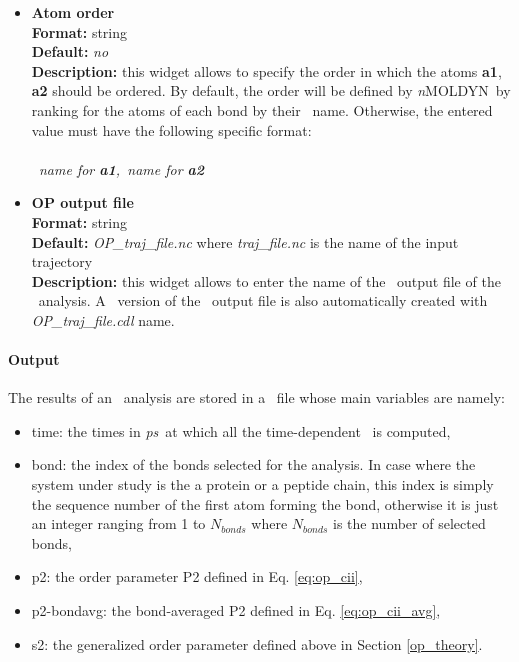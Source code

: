 \documentclass[a4paper,11pt]{report}
\newcommand{\ps}{\textit{ps}}
\newcommand{\NMOLDYN}{\textit{n}MOLDYN}
\begin{document}
\begin{itemize}
\hypertarget{op_atom_order}{}
\item \textbf{Atom order}\\
\textbf{Format:} string\\
\textbf{Default:} \textit{no}\\
\textbf{Description:} this widget allows to specify the order in which the atoms \textbf{a1}, \textbf{a2} should be 
ordered. By default, the order will be defined by \NMOLDYN\ by ranking for the atoms of each bond by their
\MMTK\ name. Otherwise, the entered value must have the following specific format:
\\\\
\textit{\MMTK\ name for \textbf{a1},\MMTK\ name for \textbf{a2}}

\hypertarget{op_op_output_file}{}
\item \textbf{OP output file}\\
\textbf{Format:} string\\
\textbf{Default:} \textit{OP\_traj\_file.nc} where \textit{traj\_file.nc} is the name of the input trajectory\\
\textbf{Description:} this widget allows to enter the name of the \NetCDF\ output file of the \OP\ analysis. A \CDL\ 
version of the \NetCDF\ output file is also automatically created with \textit{OP\_traj\_file.cdl} name.
\end{itemize}

\paragraph{Output\\}
The results of an \OP\ analysis are stored in a \NetCDF\ file whose main variables are namely:
\begin{itemize}
\item time: the times in \ps\ at which all the time-dependent \OP\ is computed,
\item bond: the index of the bonds selected for the analysis. In case where the system under study 
is the a protein or a peptide chain, this index is simply the sequence number of the first atom forming the bond, 
otherwise it is just an integer ranging from 1 to $N_{bonds}$ where $N_{bonds}$ is the number of selected bonds,
\item p2: the order parameter P2 defined in Eq. \ref{eq:op_cii},
\item p2-bondavg: the bond-averaged P2 defined in Eq. \ref{eq:op_cii_avg},
\item s2: the generalized order parameter defined above in Section \ref{op_theory}.
\end{itemize}
\end{document}
